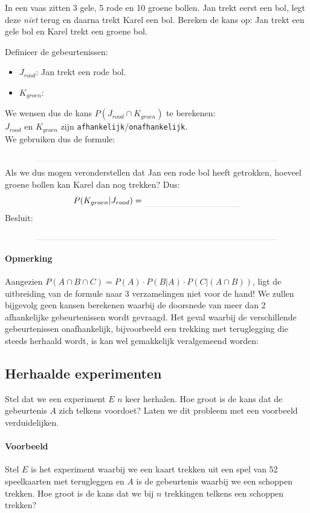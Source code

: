 \documentclass[12pt,twoside]{article}
\begin{document}
\begin{oefening}
In een vaas zitten 3 gele, 5 rode en 10 groene bollen. Jan trekt eerst een bol, legt deze {\em niet} terug en daarna trekt Karel een bol. Bereken de kans op: Jan trekt een gele bol en Karel trekt een groene bol.

Definieer de gebeurtenissen:
\begin{itemize}
  \itemsep0.1em
  \item $J_{rood}$: Jan trekt een rode bol.
  \item $K_{groen}$: \arulefill
\end{itemize}
\vspace*{0.5cm}
We wensen dus de kans $P(J_{rood}\cap K_{groen})$ te berekenen:\\
$J_{rood}$ en $K_{groen}$ zijn \verb#afhankelijk#/\verb#onafhankelijk#.\\
We gebruiken dus de formule:
$$\arule{10cm}$$
Als we dus mogen veronderstellen dat Jan een rode bol heeft getrokken, hoeveel groene bollen kan Karel dan nog trekken? \arule{2cm}
Dus:
$$P(K_{groen}|J_{rood})=\arule{4cm}$$
Besluit:
$$\arule{10cm}$$
\end{oefening}

\paragraph*{Opmerking}

Aangezien $P(A\cap B\cap C)=P(A)\cdot P(B|A) \cdot P(C|(A\cap B))$, ligt de uitbreiding van de formule naar 3 verzamelingen niet voor de hand! We zullen bijgevolg geen kansen berekenen waarbij de doorsnede van meer dan 2 afhankelijke gebeurtenissen wordt gevraagd. Het geval waarbij de verschillende gebeurtenissen onafhankelijk, bijvoorbeeld een trekking met teruglegging die steeds herhaald wordt, is kan wel gemakkelijk veralgemeend worden:

\subsection{Herhaalde experimenten}

Stel dat we een experiment $E$ $n$ keer herhalen. Hoe groot is de kans dat de gebeurtenis $A$ zich telkens voordoet?
Laten we dit probleem met een voorbeeld verduidelijken.


\paragraph*{Voorbeeld}
Stel $E$ is het experiment waarbij we een kaart trekken uit een spel van 52 speelkaarten met terugleggen en $A$ is de gebeurtenis waarbij we een schoppen trekken.
Hoe groot is de kans dat we bij $n$ trekkingen telkens een schoppen trekken?
\end{document}
